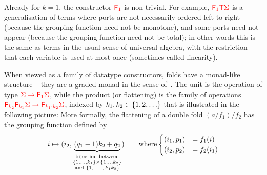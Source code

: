 Already for $k=1$, the constructor $\reduce 1$ is non-trivial. For example,  ${\color{red}{\mathsf F_{1}}}{\color{red}{\mathsf T}} {\color{red}{\Sigma}}$ is a generalisation of terms where ports are not necessarily ordered left-to-right (because the grouping function need not be monotone), and some ports need not appear (because the grouping function need not be total); in other words this is the same as terms in the usual sense of universal algebra, with the restriction that each variable is used at most once (sometimes called linearity).

When viewed as a family of datatype constructors,  folds have a monad-like structure -- they are a graded  monad in the sense of~\cite[p. 518]{fujiShinyaMellies2016}. The unit is the operation 
of type ${\color{red}{\Sigma \to {\color{red}{\mathsf F_{1}}}\Sigma}}$, while  the product (or flattening) is the family of operations ${\color{red}{{\color{red}{\mathsf F_{k_2}}}{\color{red}{\mathsf F_{k_1}}}\Sigma \to {\color{red}{\mathsf F_{k_1 \cdot k_2}}}\Sigma}}$, indexed by $k_1,k_2 \in \{1,2,\ldots\}$ that is illustrated in the following picture:
More formally, the flattening of a double fold $(a/{f_1})/{f_2}$ has the grouping function defined by
\begin{align*}
i \mapsto (i_2, \underbrace{(q_1 -1)k_2 + q_2}_{\substack{\text{bijection between} \\ \{1,\ldots,k_1\} \times \{1\ldots,k_2\} \\ \text{and $\{1,\ldots,k_1k_2\}$}}}) \qquad \text{where} \begin{cases}
    (i_1,p_1) &= f_1(i)\\
    (i_2,p_2) &= f_2(i_1)
\end{cases}
\end{align*}


